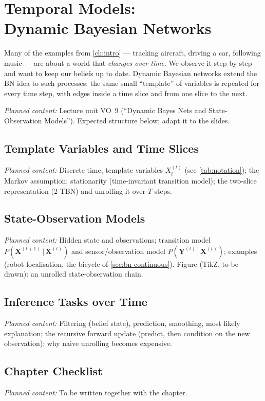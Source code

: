 \documentclass[11pt, oneside]{book}
\newcommand{\Prob}{\mathbb{P}}           %
\newcommand{\given}{\,\vert\,}           %
\newcommand{\bX}{\mathbf{X}}  \newcommand{\bY}{\mathbf{Y}}
\newcommand{\planned}[1]{%
  \par{\small\color{gray!70!black}\textit{Planned content:} #1}\par}
\let\originalsection\section
\renewcommand{\section}{\Needspace{7\baselineskip}\originalsection}
\begin{document}
\chapter[Temporal Models: Dynamic Bayesian Networks]{Temporal Models:\\ Dynamic Bayesian Networks}
\label{ch:dbn}

Many of the examples from \cref{ch:intro} --- tracking aircraft, driving a car,
following music --- are about a world that \emph{changes over time}. We
observe it step by step and want to keep our beliefs up to date. Dynamic
Bayesian networks extend the BN idea to such processes: the same small
``template'' of variables is repeated for every time step, with edges inside a
time slice and from one slice to the next.

\planned{Lecture unit VO~9 (``Dynamic Bayes Nets and State-Observation
Models''). Expected structure below; adapt it to the slides.}

\section{Template Variables and Time Slices}
\planned{Discrete time, template variables $X_i^{(t)}$ (see
\cref{tab:notation}); the Markov assumption; stationarity
(time-invariant transition model); the two-slice representation (2-TBN) and
unrolling it over $T$ steps.}

\section{State-Observation Models}
\planned{Hidden state and observations; transition model $P(\bX^{(t+1)} \given
\bX^{(t)})$ and sensor/observation model $P(\bY^{(t)} \given \bX^{(t)})$;
examples (robot localisation, the bicycle of \cref{sec:bn-continuous}).
Figure (TikZ, to be drawn): an unrolled state-observation chain.}

\section{Inference Tasks over Time}
\planned{Filtering (belief state), prediction, smoothing, most likely
explanation; the recursive forward update (predict, then condition on the new
observation); why naive unrolling becomes expensive.}

\section{Chapter Checklist}
\planned{To be written together with the chapter.}
\end{document}

